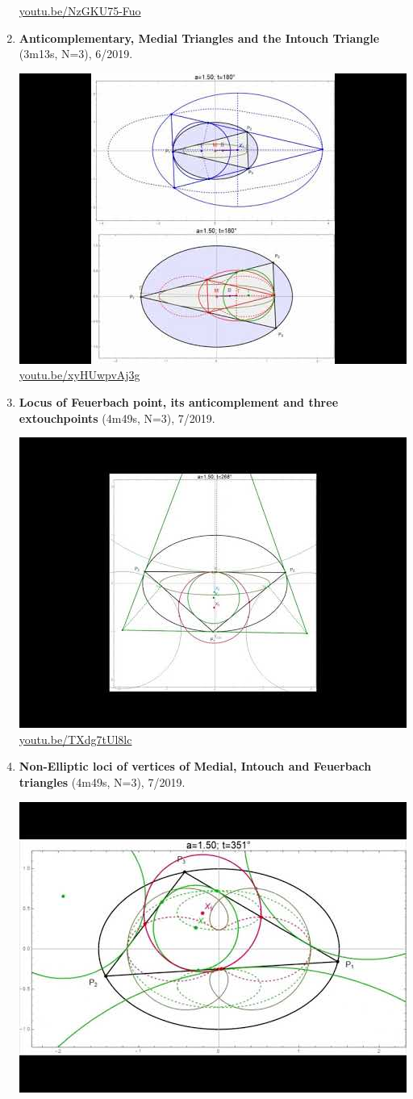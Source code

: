 \documentclass[12pt]{amsart}
\begin{document}
\begin{enumerate}[resume]
\begin{center}
\href{https://youtu.be/NzGKU75-Fuo}{\url{youtu.be/NzGKU75-Fuo}}\end{center}
% 
\item \textbf{Anticomplementary, Medial Triangles and the Intouch Triangle} (3m13s, N=3), 6/2019. 
\begin{center}\includegraphics[width=.5\textwidth]{pics/xyHUwpvAj3g.jpg} \\ 
\href{https://youtu.be/xyHUwpvAj3g}{\url{youtu.be/xyHUwpvAj3g}}\end{center}
% 
\item \textbf{Locus of Feuerbach point, its anticomplement and three extouchpoints} (4m49s, N=3), 7/2019. 
\begin{center}\includegraphics[width=.5\textwidth]{pics/TXdg7tUl8lc.jpg} \\ 
\href{https://youtu.be/TXdg7tUl8lc}{\url{youtu.be/TXdg7tUl8lc}}\end{center}
% 
\item \textbf{Non-Elliptic loci of vertices of Medial, Intouch and Feuerbach triangles} (4m49s, N=3), 7/2019. 
\begin{center}\includegraphics[width=.5\textwidth]{pics/OGvCQbYqJyI.jpg} \\ 

\end{center}
\end{enumerate}
\end{document}
